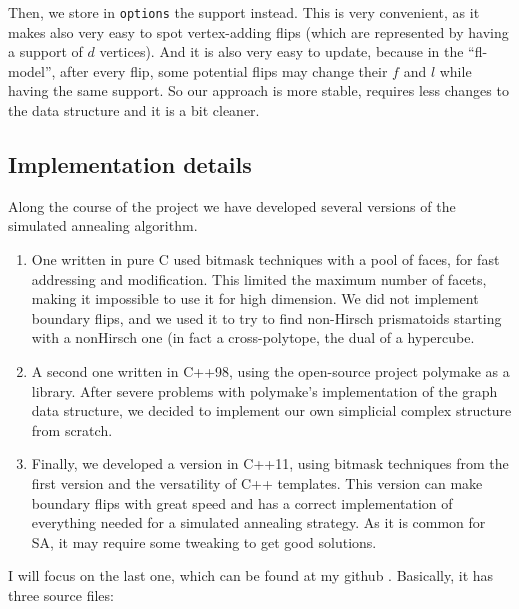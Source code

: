 \documentclass[12pt,a4paper]{article}
\theoremstyle{plain}
\theoremstyle{definition}
\begin{document}
Then, we store in \lstinline{options} the support instead. This is very convenient, as it makes also very easy to spot vertex-adding flips (which are represented by having a support of $d$ vertices). And it is also very easy to update, because in the ``fl-model'', after every flip, some potential flips may change their $f$ and $l$ while having the same support. So our approach is more stable, requires less changes to the data structure and it is a bit cleaner.
\subsection{Implementation details}

Along the course of the project we have developed several versions of the simulated annealing algorithm.

\begin{enumerate}
  \item One written in pure C used bitmask techniques with a pool of faces, for fast addressing and modification. This limited the maximum number of facets, making it impossible to use it for high dimension. We did not implement boundary flips, and we used it to try to find non-Hirsch prismatoids starting with a nonHirsch one (in fact a cross-polytope, the dual of a hypercube.
  
  \item A second one written in C++98, using the open-source project polymake \cite{polymake} as a library. After severe problems with polymake's implementation of the graph data structure, we decided to implement our own simplicial complex structure from scratch.

  \item Finally, we developed a version in C++11, using bitmask techniques from the first version and the versatility of C++ templates. This version can make boundary flips with great speed and has a correct implementation of everything needed for a simulated annealing strategy. As it is common for SA, it may require some tweaking to get good solutions.
\end{enumerate}

I will focus on the last one, which can be found at my github \cite{github}. Basically, it has three source files:
\end{document}
